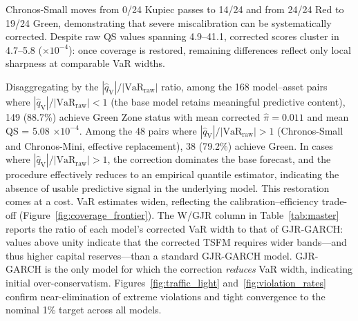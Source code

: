 \documentclass[preprint,11pt,authoryear]{elsarticle}
\newcommand{\VaR}{\mathrm{VaR}}
\newcommand{\1}{\boldsymbol{1}}
\newcommand{\qV}{\hat{q}_{\scriptscriptstyle\mathrm{V}}}
\begin{document}
	Chronos-Small moves from 0/24 Kupiec passes to 14/24 and from
	24/24 Red to 19/24 Green, demonstrating that severe
	miscalibration can be systematically corrected. Despite raw QS
	values spanning 4.9--41.1, corrected scores cluster in
	4.7--5.8 ($\times 10^{-4}$): once coverage is restored,
	remaining differences reflect only local sharpness at
	comparable VaR widths.
	
	Disaggregating by the $|\qV|/|\VaR_{\mathrm{raw}}|$
	ratio, among the 168 model--asset pairs where
	$|\qV|/|\VaR_{\mathrm{raw}}| < 1$ (the base model retains
	meaningful predictive content), 149 (88.7\%) achieve Green Zone
	status with mean corrected $\hat\pi = 0.011$ and mean
	QS = 5.08 $\times 10^{-4}$. Among the 48 pairs where
	$|\qV|/|\VaR_{\mathrm{raw}}| > 1$ (Chronos-Small and
	Chronos-Mini, effective replacement), 38 (79.2\%) achieve Green.
	In cases where $|\qV|/|\VaR_{\mathrm{raw}}| > 1$, the correction dominates the base forecast, and the procedure effectively reduces to an empirical quantile estimator, indicating the absence of usable predictive signal in the underlying model.
	This restoration comes at a cost. VaR estimates widen, reflecting
	the calibration--efficiency trade-off
	(Figure~\ref{fig:coverage_frontier}). The W/GJR column in
	Table~\ref{tab:master} reports the ratio of each model's
	corrected VaR width to that of GJR-GARCH: values above unity
	indicate that the corrected TSFM requires wider bands---and
	thus higher capital reserves---than a standard GJR-GARCH model.
	GJR-GARCH is the only model for which the correction
	\emph{reduces} VaR width, indicating initial over-conservatism.
	Figures~\ref{fig:traffic_light} and~\ref{fig:violation_rates}
	confirm near-elimination of extreme violations and tight
	convergence to the nominal 1\% target across all models.
	
\end{document}
